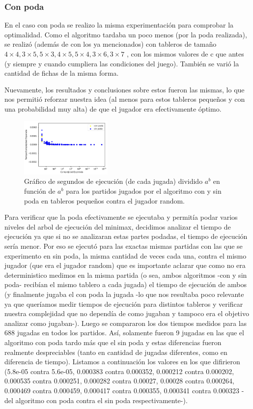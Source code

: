 \documentclass[A4paper,oneside,fleqn,11pt]{article}
\theoremstyle{definition}
\begin{document}
\subsubsection{Con poda}
En el caso con poda se realizo la misma experimentación para comprobar la optimalidad. Como el algoritmo tardaba un poco menos (por la poda realizada), se realizó (además de con los ya mencionados) con tableros de tamaño $4\times4, 3\times5, 5\times3, 4\times5, 5\times4, 3\times6, 3\times7$ , con los mismos valores de c que antes (y siempre y cuando cumpliera las condiciones del juego). También se varió la cantidad de fichas de la misma forma.

Nuevamente, los resultados y conclusiones sobre estos fueron las mismas, lo que nos permitió reforzar nuestra idea (al menos para estos tableros pequeños y con una probabilidad muy alta) de que el jugador era efectivamente óptimo.



\begin{figure}
	\includegraphics[width=0.4\textwidth]{complejidad1.png}
	\caption{ Gráfico de segundos de ejecución (de cada jugada) dividido $a^b$ en función de $a^b$ para los partidos jugados por el algoritmo con y sin poda en tableros pequeños contra el jugador random.}
\end{figure}


Para verificar que la poda efectivamente se ejecutaba y permitía podar varios niveles del arbol de ejecución del minimax, decidimos analizar el tiempo de ejecución ya que si no se analizaran estas partes podadas, el tiempo de ejecución sería menor. Por eso se ejecutó para las exactas mismas partidas con las que se experimento en sin poda, la misma cantidad de veces cada una, contra el mismo jugador (que era el jugador random) que es importante aclarar que como no era deterministico medimos en la misma partida (o sea, ambos algoritmos -con y sin poda- recibían el mismo tablero a cada jugada) el tiempo de ejecución de ambos (y finalmente jugaba el con poda la jugada -lo que nos resultaba poco relevante ya que queríamos medir tiempos de ejecución para distintos tableros y verificar nuestra complejidad que no dependía de como jugaban y tampoco era el objetivo analizar como jugaban-). Luego se compararon los dos tiempos medidos para las 688 jugadas en todos los partidos. Así, solamente fueron 9 jugadas en las que el algoritmo con poda tardo más que el sin poda y estas diferencias fueron realmente despreciables (tanto en cantidad de jugadas diferentes, como en diferencia de tiempo). Listamos a continuación los valores en los que difirieron (5.8e-05 contra 5.6e-05, 0.000383 contra 0.000352, 0.000212 contra 0.000202, 0.000535 contra 0.000251, 0.000282 contra 0.00027, 0.00028 contra 0.000264, 0.000469 contra 0.000459, 0.000417 contra 0.000355, 0.000341 contra 0.000323 -del algoritmo con poda contra el sin poda respectivamente-).
\end{document}
